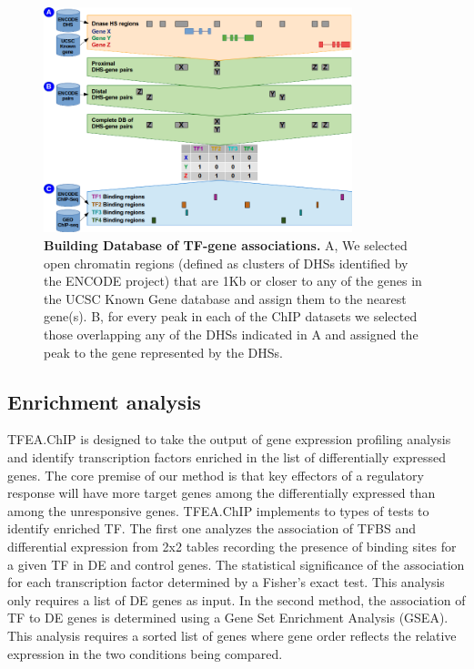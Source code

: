 \documentclass[10pt,letterpaper]{article}
\begin{document}
	\begin{figure}[h]
		\centering
		\includegraphics[width=0.8\textwidth]{fig2_LPO_v2}
		\caption{{\bf Building Database of TF-gene associations.} A, We selected open chromatin regions (defined as clusters of DHSs identified by the ENCODE project) that are 1Kb or closer to any of the genes in the UCSC Known Gene database and assign them to the nearest gene(s). B, for every peak in each of the ChIP datasets we selected those overlapping any of the DHSs indicated in A and assigned the peak to the gene represented by the DHSs.}
		\label{fig2}
	\end{figure}
	
	\subsection*{Enrichment analysis}
	TFEA.ChIP is designed to take the output of gene expression profiling analysis and identify transcription factors enriched in the list of differentially expressed genes. The core premise of our method is that key effectors of a regulatory response will have more target genes among the differentially expressed than among the unresponsive genes. TFEA.ChIP implements to types of tests to identify enriched TF. The first one analyzes the association of TFBS and differential expression from 2x2 tables recording the presence of binding sites for a given TF in DE and control genes. The statistical significance of the association for each transcription factor determined by a Fisher’s exact test. This analysis only requires a list of DE genes as input. In the second method, the association of TF to DE genes is determined using a Gene Set Enrichment Analysis (GSEA)\cite{GSEA1}. This analysis requires a sorted list of genes where gene order reflects the relative expression in the two conditions being compared.
	
\end{document}
